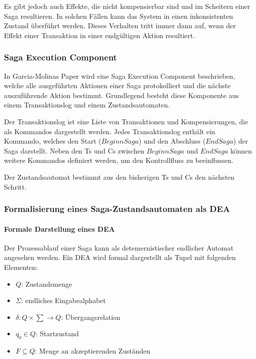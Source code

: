 Es gibt jedoch auch Effekte, die nicht kompensierbar sind und im Scheitern einer Saga resultieren. In solchen Fällen kann das System in einen inkonsistenten Zustand überführt werden. Dieses Verhalten tritt immer dann auf, wenn der Effekt einer Transaktion in einer endgültigen Aktion resultiert. %

\subsubsection{Saga Execution Component} %
In Garcia-Molinas Paper wird eine Saga Execution Component beschrieben, welche alle ausgeführten Aktionen einer Saga protokolliert und die nächste auszuführende Aktion bestimmt. Grundlegend besteht diese Komponente aus einem Transaktionslog und einem Zustandsautomaten. 

Der Transaktionslog ist eine Liste von Transaktionen und Kompensierungen, die als Kommandos dargestellt werden. Jedes Transaktionslog enthält ein Kommando, welches den Start ($Beginn Saga$) und den Abschluss ($End Saga$) der Saga darstellt. Neben den Ts und Cs zwischen $Beginn Saga$ und $End Saga$ können weitere Kommandos definiert werden, um den Kontrollfluss zu beeinflussen. 

Der Zustandsautomat bestimmt aus den bisherigen Ts und Cs den nächsten Schritt. 


\subsubsection{Formalisierung eines Saga-Zustandsautomaten als DEA}%
\paragraph{Formale Darstellung eines DEA}
Der Prozessablauf einer Saga kann als detemernistischer endlicher Automat angesehen werden. Ein DEA wird formal dargestellt als Tupel mit folgenden Elementen:
\begin{itemize}
	\item $Q$: Zustandsmenge
	\item $\Sigma$: endliches Eingabealphabet
	\item $\delta: Q \times \sum \rightarrow Q$: Übergangsrelation 
	\item $q_0 \in Q$: Startzustand
	\item $F \subseteq Q$: Menge an akzeptierenden Zuständen
\end{itemize}

